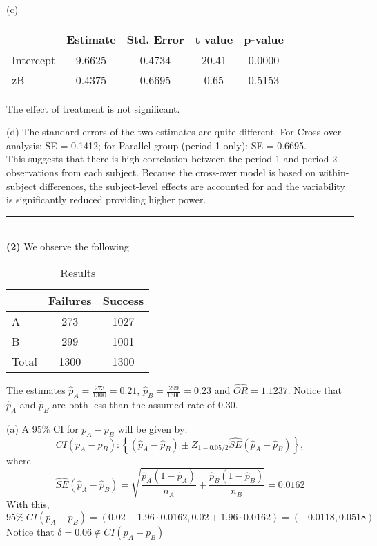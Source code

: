\documentclass[11pt,a4paper]{article}
\begin{document}
\noindent
(c)
\begin{table}[H]
\centering
\begin{tabular}{lcccc}
  \hline
 & Estimate & Std. Error & t value & p-value \\ 
  \hline
Intercept & 9.6625 & 0.4734 & 20.41 & 0.0000 \\ 
  zB & 0.4375 & 0.6695 & 0.65 & 0.5153 \\ 
   \hline
\end{tabular}
\end{table}
The effect of treatment is not significant. 

\noindent
(d) The standard errors of the two estimates are quite different. For Cross-over analysis: SE = 0.1412; for Parallel group (period 1 only): SE = 0.6695. \\
This suggests that there is high correlation between the period 1 and period 2 observations from each subject.  Because the cross-over model is based on within-subject differences, the subject-level effects are accounted for and the variability is significantly reduced providing higher power. \\
\noindent\rule{16cm}{0.4pt} \\

\noindent
\textbf{(2)} 
We observe the following
\begin{table}[H]
\centering
\begin{tabular}{lcc}
  \hline
 & Failures & Success\\ 
  \hline
A & 273 & 1027\\ 
B & 299 & 1001 \\ 
\hline
Total & 1300 & 1300\\
   \hline
\end{tabular}
\caption{Results}
\end{table}

The estimates $\hat{p}_A=\frac{273}{1300}=0.21$, $\hat{p}_B=\frac{299}{1300}=0.23$ and $\widehat{OR}=1.1237$. Notice that $\hat{p}_A$ and $\hat{p}_B$ are both less than the assumed rate of 0.30. 

\noindent
(a) A 95\% CI for $p_A-p_B$ will be given by:
$$CI(p_A-p_B):\left\{(\hat{p}_A-\hat{p}_B)\pm Z_{1-0.05/2}\widehat{SE}(\hat{p}_A-\hat{p}_B)\right\},$$
where 
\[ \widehat{SE}(\hat{p}_A-\hat{p}_B) = \sqrt{\frac{\hat{p}_A(1-\hat{p}_A)}{n_A}+\frac{\hat{p}_B(1-\hat{p}_B)}{n_B}} = 0.0162 \]
With this, 
\[ 95\%  ~CI(p_A-p_B) = (0.02-1.96\cdot 0.0162,0.02+1.96\cdot 0.0162) = (-0.0118,0.0518) \]
Notice that $\delta=0.06\notin CI(p_A-p_B)$
\end{document}
